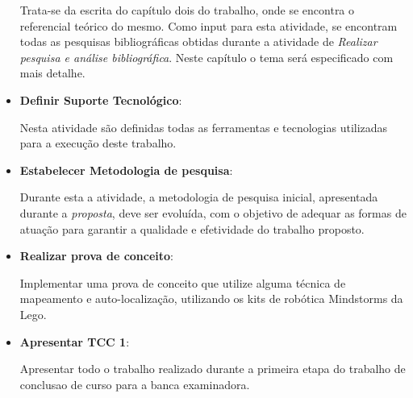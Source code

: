 \begin{itemize}
		Trata-se da escrita do capítulo dois do trabalho, onde se encontra o referencial teórico do mesmo. Como input para esta atividade, se encontram todas as pesquisas bibliográficas obtidas durante a atividade de \textit{Realizar pesquisa e análise bibliográfica}. Neste capítulo o tema será especificado com mais detalhe.

	\item \textbf{Definir Suporte Tecnológico}:

		Nesta atividade são definidas todas as ferramentas e tecnologias utilizadas para a execução deste trabalho. 

	\item \textbf{Estabelecer Metodologia de pesquisa}:

		Durante esta a atividade, a metodologia de pesquisa inicial, apresentada durante a \textit{proposta}, deve ser evoluída, com o objetivo de adequar as formas de atuação para garantir a qualidade e efetividade do trabalho proposto. 

	\item \textbf{Realizar prova de conceito}:

		Implementar uma prova de conceito que utilize alguma técnica de mapeamento e auto-localização, utilizando os kits de robótica Mindstorms da Lego.

	\item \textbf{Apresentar TCC 1}:

		Apresentar todo o trabalho realizado durante a primeira etapa do trabalho de conclusao de curso para a banca examinadora.
\end{itemize}
